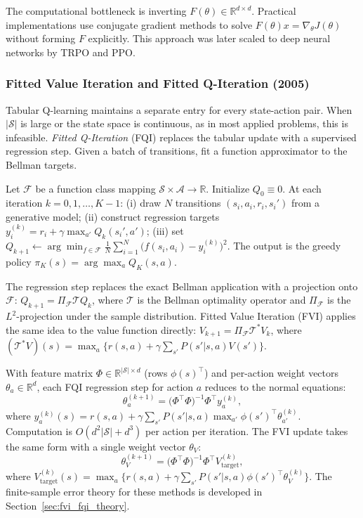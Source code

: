 The computational bottleneck is inverting $F(\theta) \in \mathbb{R}^{d \times d}$. Practical implementations use conjugate gradient methods to solve $F(\theta) x = \nabla_\theta J(\theta)$ without forming $F$ explicitly. This approach was later scaled to deep neural networks by TRPO and PPO.

\subsubsection{Fitted Value Iteration and Fitted Q-Iteration (2005)}
\label{sec:fvi_fqi_algorithms}

Tabular Q-learning maintains a separate entry for every state-action pair. When $|\mathcal{S}|$ is large or the state space is continuous, as in most applied problems, this is infeasible. \emph{Fitted Q-Iteration} (FQI) \citep{Ernst2005} replaces the tabular update with a supervised regression step. Given a batch of transitions, fit a function approximator to the Bellman targets.

Let $\mathcal{F}$ be a function class mapping $\mathcal{S} \times \mathcal{A} \to \mathbb{R}$.\label{def:fqi} Initialize $Q_0 \equiv 0$. At each iteration $k = 0, 1, \ldots, K-1$: (i) draw $N$ transitions $(s_i, a_i, r_i, s_i')$ from a generative model; (ii) construct regression targets $y_i^{(k)} = r_i + \gamma \max_{a'} Q_k(s_i', a')$; (iii) set $Q_{k+1} \leftarrow \arg\min_{f \in \mathcal{F}} \frac{1}{N} \sum_{i=1}^N \bigl( f(s_i, a_i) - y_i^{(k)} \bigr)^2$. The output is the greedy policy $\pi_K(s) = \arg\max_a Q_K(s,a)$.

The regression step replaces the exact Bellman application with a projection onto $\mathcal{F}$: $Q_{k+1} = \Pi_{\mathcal{F}} \mathcal{T} Q_k$, where $\mathcal{T}$ is the Bellman optimality operator and $\Pi_{\mathcal{F}}$ is the $L^2$-projection under the sample distribution. Fitted Value Iteration (FVI) \citep{MunosSzepesvari2008} applies the same idea to the value function directly: $V_{k+1} = \Pi_{\mathcal{F}} \mathcal{T}^* V_k$, where $(\mathcal{T}^* V)(s) = \max_a \{ r(s,a) + \gamma \sum_{s'} P(s'|s,a) V(s') \}$.

With feature matrix $\Phi \in \mathbb{R}^{|\mathcal{S}| \times d}$ (rows $\phi(s)^\top$) and per-action weight vectors $\theta_a \in \mathbb{R}^d$, each FQI regression step for action $a$ reduces to the normal equations:
\begin{equation}
\theta_a^{(k+1)} = \bigl(\Phi^\top \Phi\bigr)^{-1} \Phi^\top y_a^{(k)},
\label{eq:fqi_normal}
\end{equation}
where $y_a^{(k)}(s) = r(s,a) + \gamma \sum_{s'} P(s'|s,a) \max_{a'} \phi(s')^\top \theta_{a'}^{(k)}$. Computation is $O(d^2 |\mathcal{S}| + d^3)$ per action per iteration. The FVI update takes the same form with a single weight vector $\theta_V$:
\begin{equation}
\theta_V^{(k+1)} = \bigl(\Phi^\top \Phi\bigr)^{-1} \Phi^\top V_{\mathrm{target}}^{(k)},
\label{eq:fvi_normal}
\end{equation}
where $V_{\mathrm{target}}^{(k)}(s) = \max_a \bigl\{ r(s,a) + \gamma \sum_{s'} P(s'|s,a) \phi(s')^\top \theta_V^{(k)} \bigr\}$. The finite-sample error theory for these methods is developed in Section~\ref{sec:fvi_fqi_theory}.

